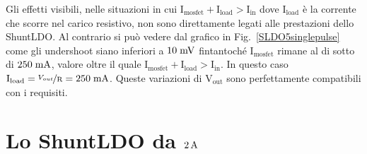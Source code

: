 Gli effetti visibili, nelle situazioni in cui $\mathrm{I_{mosfet} + I_{load} > I_{in}}$ dove $\mathrm{I_{load}}$ è la corrente che scorre nel carico resistivo, non sono direttamente legati alle prestazioni dello ShuntLDO. Al contrario si può vedere dal grafico in Fig.~\ref{SLDO5singlepulse} come gli undershoot siano inferiori a $10\rm \; mV$ fintantoché $\mathrm{I_{mosfet}}$ rimane al di sotto di $250\rm \; mA$, valore oltre il quale $\mathrm{I_{mosfet} + I_{load} > I_{in}}$. In questo caso $\mathrm{I_{load} = \nicefrac{V_{out}}{R} = 250\rm \; mA}$. Queste variazioni di  $\mathrm{V_{out}}$ sono perfettamente compatibili con i requisiti.


\section{Lo ShuntLDO da $2\rm \, A$}

